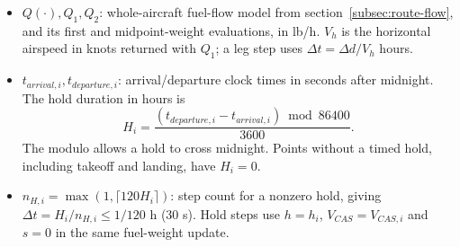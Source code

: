 \documentclass[10pt,a4paper]{amsart}
\begin{document}
\begin{itemize}
\item $Q(\cdot),Q_1,Q_2$: whole-aircraft fuel-flow model from
section~\ref{subsec:route-flow}, and its first and midpoint-weight
evaluations, in lb/h. $V_h$ is the horizontal airspeed in knots
returned with $Q_1$; a leg step uses $\Delta t=\Delta d/V_h$ hours.
\item $t_{arrival,i},t_{departure,i}$: arrival/departure clock times
in seconds after midnight. The hold duration in hours is
\[
 H_i=\frac{(t_{departure,i}-t_{arrival,i})\bmod86400}{3600}.
\]
The modulo allows a hold to cross midnight. Points without a timed
hold, including takeoff and landing, have $H_i=0$.
\item $n_{H,i}=\max(1,\lceil120H_i\rceil)$: step count for a nonzero
hold, giving $\Delta t=H_i/n_{H,i}\leq1/120$ h (30 s).
Hold steps use $h=h_i$, $V_{CAS}=V_{CAS,i}$ and $s=0$ in the same
fuel-weight update.
\end{itemize}
\end{document}
